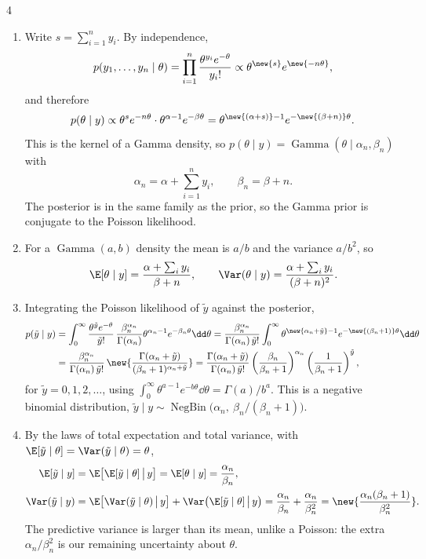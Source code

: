 \begin{homework}{4}
\soln
\begin{enumerate}[label=(\roman*)]
\item Write $s = \sum_{i=1}^{n} y_i$. By independence,
\[
p(y_1, \dots, y_n \mid \theta) = \prod_{i=1}^{n}\frac{\theta^{y_i}e^{-\theta}}{y_i!} \propto \theta^{\new{s}}e^{\new{-n\theta}},
\]
and therefore
\[
p(\theta \mid y) \propto \theta^{s}e^{-n\theta}\cdot\theta^{\alpha-1}e^{-\beta\theta} = \theta^{\new{(\alpha+s)}-1}e^{-\new{(\beta+n)}\theta}.
\]
This is the kernel of a Gamma density, so $p(\theta \mid y) = \operatorname{Gamma}(\theta \mid \alpha_n, \beta_n)$ with
\[
\alpha_n = \alpha + \sum_{i=1}^{n} y_i, \qquad \beta_n = \beta + n.
\]
The posterior is in the same family as the prior, so the Gamma prior is conjugate to the Poisson likelihood.
\item For a $\operatorname{Gamma}(a, b)$ density the mean is $a/b$ and the variance $a/b^2$, so
\[
\E[\theta \mid y] = \frac{\alpha + \sum_i y_i}{\beta + n}, \qquad
\Var(\theta \mid y) = \frac{\alpha + \sum_i y_i}{(\beta + n)^2}.
\]
\item Integrating the Poisson likelihood of $\tilde y$ against the posterior,
\begin{align*}
p(\tilde y \mid y) &= \int_0^\infty \frac{\theta^{\tilde y}e^{-\theta}}{\tilde y!}\,\frac{\beta_n^{\alpha_n}}{\Gamma(\alpha_n)}\theta^{\alpha_n-1}e^{-\beta_n\theta}\dd\theta
= \frac{\beta_n^{\alpha_n}}{\Gamma(\alpha_n)\,\tilde y!}\int_0^\infty \theta^{\new{\alpha_n+\tilde y}-1}e^{-\new{(\beta_n+1)}\theta}\dd\theta\\
&= \frac{\beta_n^{\alpha_n}}{\Gamma(\alpha_n)\,\tilde y!}\,\new{\frac{\Gamma(\alpha_n+\tilde y)}{(\beta_n+1)^{\alpha_n+\tilde y}}}
= \frac{\Gamma(\alpha_n+\tilde y)}{\Gamma(\alpha_n)\,\tilde y!}\left(\frac{\beta_n}{\beta_n+1}\right)^{\alpha_n}\left(\frac{1}{\beta_n+1}\right)^{\tilde y},
\end{align*}
for $\tilde y = 0, 1, 2, \dots$, using $\int_0^\infty \theta^{a-1}e^{-b\theta}\dd\theta = \Gamma(a)/b^{a}$. This is a negative binomial distribution, $\tilde y \mid y \sim \operatorname{NegBin}\big(\alpha_n,\ \beta_n/(\beta_n+1)\big)$.
\item By the laws of total expectation and total variance, with $\E[\tilde y \mid \theta] = \Var(\tilde y \mid \theta) = \theta$,
\begin{align*}
\E[\tilde y \mid y] &= \E\big[\E[\tilde y \mid \theta] \,\big|\, y\big] = \E[\theta \mid y] = \frac{\alpha_n}{\beta_n},\\
\Var(\tilde y \mid y) &= \E\big[\Var(\tilde y \mid \theta) \,\big|\, y\big] + \Var\big(\E[\tilde y \mid \theta] \,\big|\, y\big)
= \frac{\alpha_n}{\beta_n} + \frac{\alpha_n}{\beta_n^2} = \new{\frac{\alpha_n(\beta_n+1)}{\beta_n^2}}.
\end{align*}
The predictive variance is larger than its mean, unlike a Poisson: the extra $\alpha_n/\beta_n^2$ is our remaining uncertainty about $\theta$.
\end{enumerate}
\end{homework}

